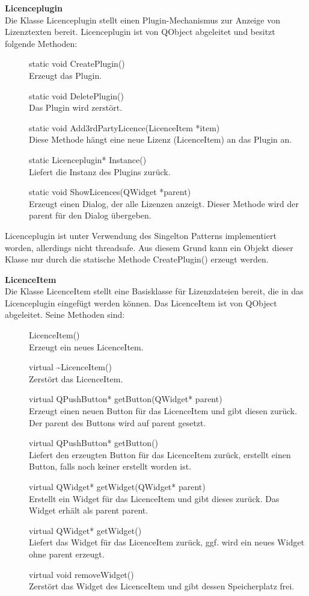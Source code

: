 \textbf{Licenceplugin}\\
Die Klasse Licenceplugin stellt einen Plugin-Mechanismus zur Anzeige von Lizenztexten bereit. Licenceplugin ist von QObject abgeleitet und besitzt folgende Methoden:
\begin{description}
	\item[ ] static void CreatePlugin()\\
	Erzeugt das Plugin.
  \item[ ] static void DeletePlugin()\\
	Das Plugin wird zerstört.
  \item[ ] static void Add3rdPartyLicence(LicenceItem *item)\\
	Diese Methode hängt eine neue Lizenz (LicenceItem) an das Plugin an.
  \item[ ] static Licenceplugin* Instance()\\
	Liefert die Instanz des Plugins zurück.
  \item[ ] static void ShowLicences(QWidget *parent)\\
	Erzeugt einen Dialog, der alle Lizenzen anzeigt. Dieser Methode wird der parent für den Dialog übergeben.
\end{description}
Licenceplugin ist unter Verwendung des Singelton Patterns implementiert worden, allerdings nicht threadsafe. Aus diesem Grund kann ein Objekt dieser Klasse nur durch die statische Methode CreatePlugin() erzeugt werden.

\textbf{LicenceItem}\\
Die Klasse LicenceItem stellt eine Basisklasse für Lizenzdateien bereit, die in das Licenceplugin eingefügt werden können. Das LicenceItem ist von QObject abgeleitet. Seine Methoden sind:
\begin{description}
	\item[ ] LicenceItem()\\
	Erzeugt ein neues LicenceItem.
  \item[ ] virtual \~{}LicenceItem()\\
	Zerstört das LicenceItem.
  \item[ ] virtual QPushButton* getButton(QWidget* parent)\\
	Erzeugt einen neuen Button für das LicenceItem und gibt diesen zurück. Der parent des Buttons wird auf parent gesetzt.
  \item[ ] virtual QPushButton* getButton()\\
	Liefert den erzeugten Button für das LicenceItem zurück, erstellt einen Button, falls noch keiner erstellt worden ist.
  \item[ ] virtual QWidget* getWidget(QWidget* parent)\\
	Erstellt ein Widget für das LicenceItem und gibt dieses zurück. Das Widget erhält als parent parent.
  \item[ ] virtual QWidget* getWidget()\\
	Liefert das Widget für das LicenceItem zurück, ggf. wird ein neues Widget ohne parent erzeugt.
  \item[ ] virtual void removeWidget()\\
	Zerstört das Widget des LicenceItem und gibt dessen Speicherplatz frei.
\end{description}

